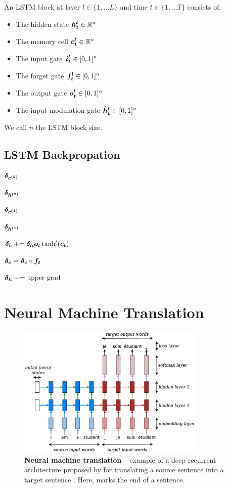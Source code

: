 An LSTM block at layer $l \in \{1, \dots L\}$ and time $t \in \{1, \dots T\}$ consists of:
\begin{itemize}
\item The hidden state $\mbox{\boldmath{$h^l_t$}} \in \mathbb{R}^n$
\item The memory cell $\mbox{\boldmath{$c^l_t$}} \in \mathbb{R}^n$
\item The input gate $\mbox{\boldmath{$i^l_t$}} \in [0,1]^n$
\item The forget gate $\mbox{\boldmath{$f^l_t$}} \in [0,1]^n$
\item The output gate $\mbox{\boldmath{$o^l_t$}} \in [0,1]^n$
\item The input modulation gate $\mbox{\boldmath{$\hat{h}^l_t$}} \in [0,1]^n$
\end{itemize}
We call $n$ the LSTM block size.

\subsection{LSTM Backpropation}
$\mbox{\boldmath{$\delta_{c^{(2)}}$}}$

$\mbox{\boldmath{$\delta_{h^{(2)}}$}}$

$\mbox{\boldmath{$\delta_{c^{(1)}}$}}$

$\mbox{\boldmath{$\delta_{h^{(1)}}$}}$

$\mbox{\boldmath{$\delta_{c}$}} \mathrel{+}= \mbox{\boldmath{$\delta_{h}$}}\mbox{\boldmath{$o_t$}}\tanh'(\mbox{\boldmath{$c_t$}}) $

$\mbox{\boldmath{$\delta_{c}$}} = \mbox{\boldmath{$\delta_{c}$}} \circ \mbox{\boldmath{$f_t$}} $

$\mbox{\boldmath{$\delta_{h}$}} \mathrel{+}= \text{upper grad}$


\section{Neural Machine Translation}
\begin{figure}[tbh!]
\centering
\includegraphics[width=0.8\textwidth, clip=true, trim= 0 0 0
0]{img/nmt_very_details.eps} %
\caption[Neural machine translation]{{\bf Neural machine translation} -- example of a deep recurrent
architecture proposed by  for
translating a source sentence  into a target sentence
. Here, \word{\texttt{\_}} marks the end of a sentence.
} 
\label{f:nmt_details}
\end{figure}


